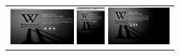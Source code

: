 \documentclass{acm_proc_article-sp}
\newcommand{\thumbheight}{14mm}
\newenvironment{thumbsequence}{}{\makebox[4mm]{}}
\begin{document}
\begin{figure}
\begin{tabular}{p{\textwidth}}
\begin{thumbsequence}
		\includegraphics[height=\thumbheight]{resources/sopa/looseduplicate10.png}
		\includegraphics[height=\thumbheight]{resources/sopa/looseduplicate11.jpg}
		\includegraphics[height=\thumbheight]{resources/sopa/looseduplicate12.jpg}

\end{thumbsequence}
\end{tabular}
\end{figure}
\end{document}
